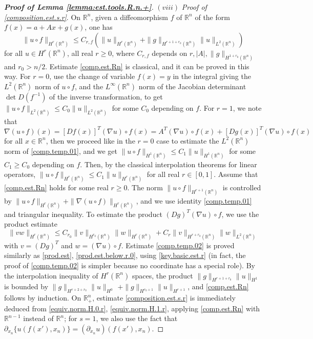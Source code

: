 \documentclass[10pt,reqno,a4paper]{article}
\numberwithin{equation}{section}
\theoremstyle{plain}
\theoremstyle{definition}
\newcommand{\R}{{\mathbb R}}
\newcommand{\pa}{\partial}
\newcommand{\grad}{\nabla}
\begin{document}
\begin{proof}[\textbf{Proof of Lemma \ref{lemma:est.tools.R.n.+}}]
$(viii)$ \emph{Proof of \eqref{composition.est.s.r}}. 
On $\R^n$, given a diffeomorphism $f$ of $\R^n$ of the form $f(x) = a + A x + g(x)$, 
one has 
\begin{equation} \label{comp.est.Rn}
\| u \circ f \|_{H^r(\R^n)} 
\leq C_{r,f} ( \| u \|_{H^r(\R^n)} + \| g \|_{H^{r+1+r_0}(\R^n)} \| u \|_{L^2(\R^n)})
\end{equation} 
for all $u \in H^r(\R^n)$, 
all real $r \geq 0$, 
where $C_{r,f}$ depends on $r,|A|, \| g \|_{H^{1+r_0}(\R^n)}$
and $r_0 > n/2$.
Estimate \eqref{comp.est.Rn} is classical, and it can be proved in this way. 
For $r=0$, use the change of variable $f(x) = y$ in the integral 
giving the $L^2(\R^n)$ norm of $u \circ f$, 
and the $L^\infty(\R^n)$ norm of the Jacobian determinant $\det D(f^{-1})$
of the inverse transformation, 
to get $\| u \circ f \|_{L^2(\R^n)} \leq C_0 \| u \|_{L^2(\R^n)}$ 
for some $C_0$ depending on $f$.  
For $r=1$, we note that 
\begin{equation} \label{comp.temp.01}
\grad (u \circ f)(x) = [Df(x)]^T (\grad u)\circ f(x)
= A^T (\grad u)\circ f(x) + [Dg(x)]^T (\grad u)\circ f(x)
\end{equation}
for all $x \in \R^n$, then we proceed like in the $r=0$ case 
to estimate the $L^2(\R^n)$ norm of \eqref{comp.temp.01}, 
and we get 
$\| u \circ f \|_{H^1(\R^n)} \leq C_1 \| u \|_{H^1(\R^n)}$ 
for some $C_1 \geq C_0$ depending on $f$.  
Then, by the classical interpolation theorems for linear operators, 
$\| u \circ f \|_{H^r(\R^n)} \leq C_1 \| u \|_{H^r(\R^n)}$
for all real $r \in [0,1]$.  
Assume that \eqref{comp.est.Rn} holds for some real $r \geq 0$. 
The norm $\| u \circ f \|_{H^{r+1}(\R^n)}$ is controlled by $\| u \circ f \|_{H^r(\R^n)}
+ \| \grad(u \circ f) \|_{H^r(\R^n)}$, and we use identity \eqref{comp.temp.01} 
and triangular inequality. 
To estimate the product $(Dg)^T (\grad u)\circ f$,
we use the product estimate 
\begin{equation} \label{comp.temp.02}
\| v w \|_{H^r(\R^n)} 
\leq C_{r_0} \| v \|_{H^{r_0}(\R^n)} \| w \|_{H^r(\R^n)} 
+ C_r \| v \|_{H^{r+r_0}(\R^n)} \| w \|_{L^2(\R^n)}
\end{equation}
with $v = (Dg)^T$ and $w = (\grad u) \circ f$. 
Estimate \eqref{comp.temp.02} is proved similarly as \eqref{prod.est}, \eqref{prod.est.below.r.0},
using \eqref{key.basic.est.r} (in fact, the proof of \eqref{comp.temp.02} is simpler
because no coordinate has a special role). 
By the interpolation inequality of $H^r(\R^n)$ spaces, 
the product $\| g \|_{H^{r+1+r_0}} \| u \|_{H^1}$ 
is bounded by $\| g \|_{H^{r+2+r_0}} \| u \|_{H^0}$ 
$+ \| g \|_{H^{r_0+1}} \| u \|_{H^{r+1}}$,
and \eqref{comp.est.Rn} follows by induction. 
%
On $\R^n_+$, estimate \eqref{composition.est.s.r} is immediately deduced from 
\eqref{equiv.norm.H.0.r},
\eqref{equiv.norm.H.1.r}, 
applying \eqref{comp.est.Rn} with $\R^{n-1}$ instead of $\R^n$; 
for $s=1$, we also use the fact that
$\pa_{x_n} \{ u(f(x'),x_n) \} = (\pa_{x_n} u)(f(x'),x_n)$. 
\end{proof}
\end{document}
